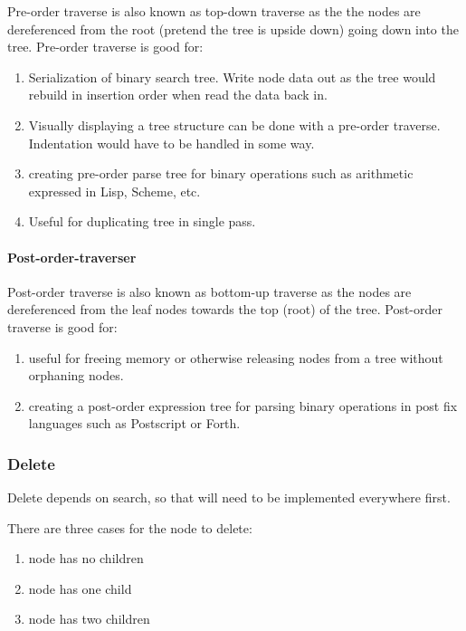 \documentclass{article}
\begin{document}
Pre-order traverse is also known as top-down traverse as the the nodes
are dereferenced from the root (pretend the tree is upside down) going
down into the tree. Pre-order traverse is good for:

\begin{enumerate}
  \item Serialization of binary search tree.
    Write node data out
    as the tree would rebuild in insertion order when read the data back in.
  \item Visually displaying a tree structure can be done with a pre-order traverse.
    Indentation would have to be handled in some way.
  \item creating pre-order parse tree for binary operations such as arithmetic
    expressed in Lisp, Scheme, etc.
  \item Useful for duplicating tree in single pass.
\end{enumerate}

\paragraph{Post-order-traverser}

Post-order traverse is also known as bottom-up traverse as the nodes
are dereferenced from the leaf nodes towards the top (root) of the
tree. Post-order traverse is good for:

\begin{enumerate}
  \item useful for freeing memory or otherwise releasing
    nodes from a tree without orphaning nodes.
  \item creating a post-order expression tree for parsing binary operations
    in post fix languages such as Postscript or Forth.
\end{enumerate}

\subsubsection{Delete}

Delete depends on search, so that will need to be implemented everywhere first.

There are three cases for the node to delete:

\begin{enumerate}
\item node has no children
\item node has one child
\item node has two children
\end{enumerate}
\end{document}

